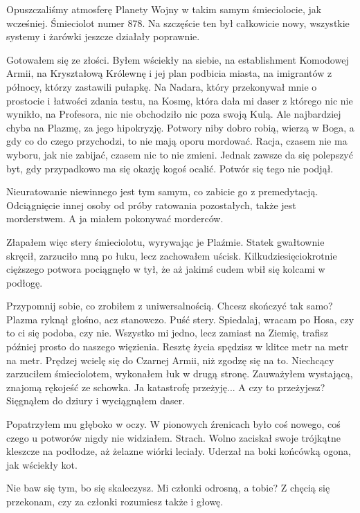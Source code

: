 Opuszczaliśmy atmosferę Planety Wojny w takim samym śmieciolocie, jak wcześniej. Śmieciolot numer 878.
Na szczęście ten był całkowicie nowy, wszystkie systemy i żarówki jeszcze działały poprawnie.

Gotowałem się ze złości. Byłem wściekły na siebie, na establishment Komodowej Armii, na Kryształową Królewnę i jej plan podbicia miasta, na imigrantów z północy, którzy zastawili pułapkę.
Na Nadara, który przekonywał mnie o prostocie i łatwości zdania testu, na Kosmę, która dała mi daser z którego nic nie wynikło, na Profesora, nic nie obchodziło nic poza swoją Kulą.
Ale najbardziej chyba na Plazmę, za jego hipokryzję. 
Potwory niby dobro robią, wierzą w Boga, a gdy co do czego przychodzi, to nie mają oporu mordować.
Racja, czasem nie ma wyboru, jak nie zabijać, czasem nic to nie zmieni. Jednak zawsze da się polepszyć byt, gdy przypadkowo ma się okazję kogoś ocalić.
Potwór się tego nie podjął. 

Nieuratowanie niewinnego jest tym samym, co zabicie go z premedytacją.
Odciągnięcie innej osoby od próby ratowania pozostałych, także jest morderstwem.
A ja miałem pokonywać morderców.

Złapałem więc stery śmieciolotu, wyrywając je Plaźmie.
Statek gwałtownie skręcił, zarzuciło mną po łuku, lecz zachowałem uścisk.
Kilkudziesięciokrotnie cięższego potwora pociągnęło w tył, że aż jakimś cudem wbił się kolcami w podłogę.

\begin{dialogue}
\ds{} Przypomnij sobie, co zrobiłem z uniwersalnością. Chcesz skończyć tak samo? \dm{} Plazma ryknął głośno, acz stanowczo. \dm{} Puść stery.
\ds{} Spiedalaj, wracam po Hosa, czy to ci się podoba, czy nie.
\ds{} Wszystko mi jedno, lecz zamiast na Ziemię, trafisz później prosto do naszego więzienia. Resztę życia spędzisz w klitce metr na metr na metr.
\ds{} Prędzej wcielę się do Czarnej Armii, niż zgodzę się na to. \dm{} Niechcący zarzuciłem śmieciolotem, wykonałem łuk w drugą stronę. Zauważyłem wystającą, znajomą rękojeść ze schowka.
\ds{} Ja katastrofę przeżyję...
\ds{} A czy to przeżyjesz? \dm{} Sięgnąłem do dziury i wyciągnąłem daser. 
\end{dialogue}
Popatrzyłem mu głęboko w oczy. W pionowych źrenicach było coś nowego, coś czego u potworów nigdy nie widziałem. Strach.
Wolno zaciskał swoje trójkątne kleszcze na podłodze, aż żelazne wiórki leciały.
Uderzał na boki końcówką ogona, jak wściekły kot.

\begin{dialogue}
\ds{} Nie baw się tym, bo się skaleczysz. Mi członki odrosną, a tobie?
\ds{} Z chęcią się przekonam, czy za członki rozumiesz także i głowę.
\end{dialogue}

